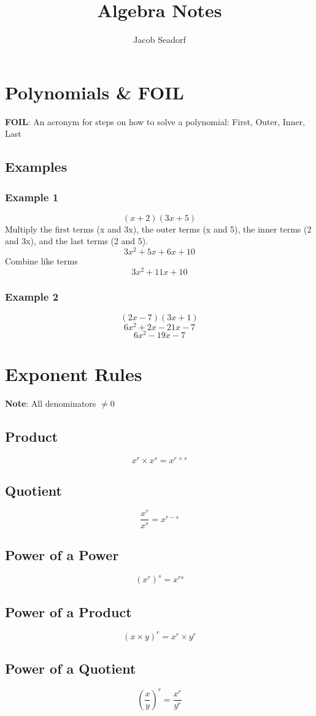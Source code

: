 \documentclass{article}
\title{Algebra Notes}
\author{Jacob Seadorf}
\begin{document}
	\maketitle
\section{Polynomials \& FOIL}
\textbf{FOIL}: An acronym for steps on how to solve a polynomial: First, Outer, Inner, Last
\subsection{Examples}
\subsubsection{Example 1}
$$
(x+2)(3x+5)
$$
Multiply the first terms (x and 3x), the outer terms (x and 5), the inner terms (2 and 3x), and the last terms (2 and 5).
$$
3x^2 + 5x + 6x + 10
$$
Combine like terms
$$
3x^2 + 11x + 10
$$

\subsubsection{Example 2}
$$(2x - 7)(3x + 1)$$
$$6x^2 + 2x - 21x - 7$$
$$6x^2 - 19x - 7$$

\section{Exponent Rules}
\textbf{Note}: All denominators $\ne 0$
\subsection{Product} 
	$$
	x^r \times x^s = x^{r+s}
	$$
\subsection{Quotient}
	$$
	\frac{x^r}{x^s} = x^{r-s}
	$$
\subsection{Power of a Power}
	$$
	(x^r)^s = x^{rs}
	$$
\subsection{Power of a Product}
	$$
	(x \times y)^r = x^r \times y^r
	$$
\subsection{Power of a Quotient}
	$$
	\left(\frac{x}{y}\right)^r = \frac{x^r}{y^r}	
	$$
\end{document}
